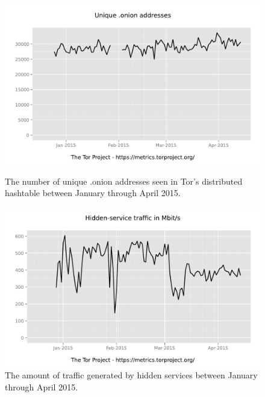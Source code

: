 \begin{figure}[htdp]
	\begin{minipage}[b]{0.48\linewidth}
		\centering
		\includegraphics[width=\textwidth]{images/Tor/onion_2014-10_2015-04.pdf}
		\caption{The number of unique .onion addresses seen in Tor's distributed hashtable between January through April 2015.\cite{TorMetrics}\cite{kadianakis2015extrapolating}}
	\end{minipage}
	\hspace{0.5cm}
	\begin{minipage}[b]{0.48\linewidth}
		\centering
		\includegraphics[width=\textwidth]{images/Tor/onionbw_2014-11_2015-04.pdf}
		\caption{The amount of traffic generated by hidden services between January through April 2015.\cite{TorMetrics}\cite{kadianakis2015extrapolating}}
	\end{minipage}
\end{figure}

\newpage

